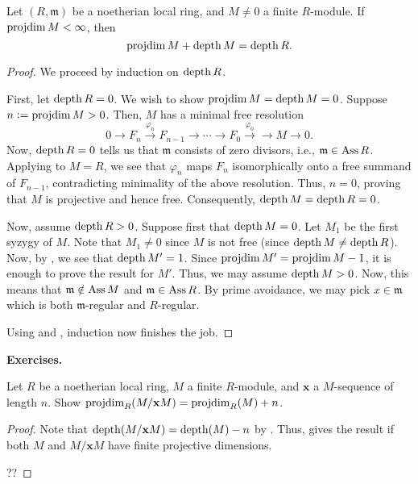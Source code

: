 \documentclass[12pt]{article}
\begin{document}
\begin{thm} \label{thm:auslander-buchsbaum}
	Let $(R, \mathfrak{m})$ be a noetherian local ring, and $M \neq 0$ a finite $R$-module. If $\operatorname{projdim} M < \infty$, then
	\begin{equation*} 
		\operatorname{projdim} M + \operatorname{depth} M = \operatorname{depth} R.
	\end{equation*}
\end{thm}
\begin{proof} 
	We proceed by induction on $\operatorname{depth} R$.

	First, let $\operatorname{depth} R = 0$. We wish to show $\operatorname{projdim} M = \operatorname{depth} M = 0$. Suppose $n \vcentcolon= \operatorname{projdim} M > 0$. Then, $M$ has a minimal free resolution
	\begin{equation*} 
		0 \to F_{n} \xrightarrow{\varphi_{n}} F_{n - 1} \to \cdots \to F_{0} \xrightarrow{\varphi_{0}} \to M \to 0.
	\end{equation*}
	Now, $\operatorname{depth} R = 0$ tells us that $\mathfrak{m}$ consists of zero divisors, i.e., $\mathfrak{m} \in \operatorname{Ass} R$. Applying  to $M = R$, we see that $\varphi_{n}$ maps $F_{n}$ isomorphically onto a free summand of $F_{n - 1}$, contradicting minimality of the above resolution. \newline
	Thus, $n = 0$, proving that $M$ is projective and hence free. Consequently, $\operatorname{depth} M = \operatorname{depth} R = 0$.

	Now, assume $\operatorname{depth} R > 0$. Suppose first that $\operatorname{depth} M = 0$. Let $M_{1}$ be the first syzygy of $M$. Note that $M_{1} \neq 0$ since $M$ is not free (since $\operatorname{depth} M \neq \operatorname{depth} R$). Now, by , we see that $\operatorname{depth} M' = 1$. Since $\operatorname{projdim} M' = \operatorname{projdim} M - 1$, it is enough to prove the result for $M'$. Thus, we may assume $\operatorname{depth} M > 0$. \newline
	Now, this means that $\mathfrak{m} \notin \operatorname{Ass} M$ and $\mathfrak{m} \in \operatorname{Ass} R$. By prime avoidance, we may pick $x \in \mathfrak{m}$ which is both $\mathfrak{m}$-regular and $R$-regular.

	Using  and , induction now finishes the job.
\end{proof}

\textbf{Exercises.}

\begin{ex}
	Let $R$ be a noetherian local ring, $M$ a finite $R$-module, and $\mathbf{x}$ a $M$-sequence of length $n$. Show $\operatorname{projdim}_{R}(M/\mathbf{x} M) = \operatorname{projdim}_{R}(M) + n$.
\end{ex}
\begin{proof} 
	Note that $\operatorname{depth}(M/\mathbf{x} M) = \operatorname{depth}(M) - n$ by . Thus,  gives the result if both $M$ and $M/\mathbf{x} M$ have finite projective dimensions.

	??
\end{proof}
\end{document}
